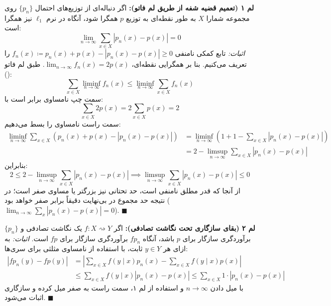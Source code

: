 \textbf{لم ۱ (تعمیم قضیه شفه از طریق لم فاتو):}
اگر دنباله‌ای از توزیع‌های احتمال $\{p_n\}$ روی مجموعه شمارا $X$ به طور نقطه‌ای به توزیع $p$ همگرا شود، آنگاه در نرم $\ell_1$ نیز همگرا است:
\begin{equation}
    \lim_{n \to \infty} \sum_{x \in X} |p_n(x) - p(x)| = 0
\end{equation}
\textit{اثبات:}
تابع کمکی نامنفی $f_n(x) \coloneqq p_n(x) + p(x) - |p_n(x) - p(x)| \ge 0$ را تعریف می‌کنیم. بنا بر همگرایی نقطه‌ای، $\lim_{n \to \infty} f_n(x) = 2p(x)$. طبق لم فاتو ():
\begin{equation}
    \sum_{x \in X} \liminf_{n \to \infty} f_n(x) \le \liminf_{n \to \infty} \sum_{x \in X} f_n(x)
\end{equation}
سمت چپ نامساوی برابر است با:
\begin{equation}
    \sum_{x \in X} 2p(x) = 2 \sum_{x \in X} p(x) = 2
\end{equation}
سمت راست نامساوی را بسط می‌دهیم:
\begin{equation}
    \begin{aligned}
        \liminf_{n \to \infty} \sum_{x \in X} \left( p_n(x) + p(x) - |p_n(x) - p(x)| \right) &= \liminf_{n \to \infty} \left( 1 + 1 - \sum_{x \in X} |p_n(x) - p(x)| \right) \\
        &= 2 - \limsup_{n \to \infty} \sum_{x \in X} |p_n(x) - p(x)|
    \end{aligned}
\end{equation}
بنابراین:
\begin{equation}
    2 \le 2 - \limsup_{n \to \infty} \sum_{x \in X} |p_n(x) - p(x)| \implies \limsup_{n \to \infty} \sum_{x \in X} |p_n(x) - p(x)| \le 0
\end{equation}
از آنجا که قدر مطلق نامنفی است، حد تحتانی نیز بزرگتر یا مساوی صفر است؛ در نتیجه حد مجموع در بی‌نهایت دقیقاً برابر صفر خواهد بود ($\lim_{n \to \infty} \sum_{x} |p_n(x) - p(x)| = 0$). $\blacksquare$

\textbf{لم ۲ (بقای سازگاری تحت نگاشت تصادفی):}
اگر $f: X \rightsquigarrow Y$ یک نگاشت تصادفی و $\{p_n\}$ برآوردگری سازگار برای $p$ باشد، آنگاه $f p_n$ برآوردگری سازگار برای $f p$ است.
\textit{اثبات:}
به ازای هر $y \in Y$ ثابت، با استفاده از نامساوی مثلثی برای سری‌ها:
\begin{equation}
    \begin{aligned}
        |f p_n(y) - f p(y)| &= \left| \sum_{x \in X} f(y \mid x) p_n(x) - \sum_{x \in X} f(y \mid x) p(x) \right| \\
        &\le \sum_{x \in X} f(y \mid x) |p_n(x) - p(x)| \le \sum_{x \in X} 1 \cdot |p_n(x) - p(x)|
    \end{aligned}
\end{equation}
با میل دادن $n \to \infty$ و استفاده از لم ۱، سمت راست به صفر میل کرده و سازگاری اثبات می‌شود. $\blacksquare$

